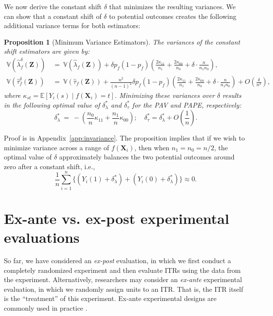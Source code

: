 \documentclass[USenglish,onecolumn]{article}
\newcommand\E{\mathbb{E}}
\newcommand\V{\mathbb{V}}
\newcommand\bX{\bm{X}}
\newcommand\bZ{\bm{Z}}
\newtheorem{proposition}{Proposition}
\begin{document}
We now derive the constant shift $\delta$ that minimizes the resulting
variances.  We can show that a constant shift of $\delta$ to potential
outcomes creates the following additional variance terms for both
estimators:
\begin{proposition}[Minimum Variance
  Estimators] \label{prop:invariance} The variances of the constant
  shift estimators are given by:
  \begin{align*}
    \V(\hat\lambda^\delta_f(\bZ))  & \ = \ \V(\hat\lambda_f(\bZ)) +
                                     \delta
                                     p_f(1-p_f)\left(\frac{2\kappa_{11}}{n_1}+
                                     \frac{2\kappa_{00}}{n_0}+ \delta \cdot \frac{n}{n_1n_0}\right),\\
    \V(\hat\tau^\delta_f(\bZ)) & \ = \ \V(\hat\tau_f(\bZ)) +
                                 \frac{n^2}{(n-1)^2} \delta
                                 p_f(1-p_f)\left(\frac{2\kappa_{11}}{n_1}+
                                 \frac{2\kappa_{00}}{n_0}+ \delta \cdot \frac{n}{n_1n_0}\right) + O\left(\frac{\delta}{n^2}\right),
  \end{align*}
  where $\kappa_{st}= \E[Y_i(s) \mid f(\bX_i)=t]$. Minimizing these
  variances over $\delta$ results in the following optimal value of
  $\delta^\ast_\lambda$ and $\delta^\ast_\tau$ for the PAV and PAPE,
  respectively:
\begin{equation*}
	\delta^\ast_\lambda \ = \
        -\left(\frac{n_0}{n}\kappa_{11}+\frac{n_1}{n}\kappa_{00}\right);
        \quad \delta^\ast_\tau  = \delta^\ast_\lambda + O\left(\frac{1}{n}\right).\label{eq:optimal-delta}
\end{equation*}
\end{proposition}
Proof is in Appendix~\ref{app:invariance}.  The proposition implies
that if we wish to minimize variance across a range of $f(\bX_i)$,
then when $n_1=n_0=n/2$, the optimal value of $\delta$ approximately
balances the two potential outcomes around zero after a constant
shift, i.e.,
$$\frac{1}{n}\sum_{i=1}^n \{(Y_i(1) + \delta^\ast_\lambda) + (Y_i(0) +
\delta^\ast_\lambda)\} \approx 0.$$

\section{Ex-ante vs. ex-post experimental evaluations}
\label{subsec:expostexantedisc}

So far, we have considered an \textit{ex-post} evaluation, in which we
first conduct a completely randomized experiment and then evaluate
ITRs using the data from the experiment.  Alternatively, researchers
may consider an {\it ex-ante} experimental evaluation, in which we
randomly assign units to an ITR.  That is, the ITR itself is the
``treatment'' of this experiment.  Ex-ante experimental designs are
commonly used in practice \citep[see][for
example]{kumar2020orderrex,forman2019randomized}.
\end{document}
